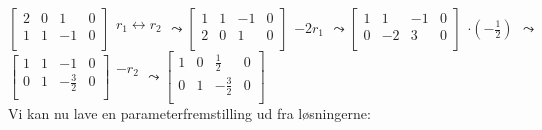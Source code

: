 \documentclass[a4paper,12pt]{article}
\begin{document}
$
\left[\begin{array}{ccc|c}
    2 & 0 & 1 & 0 \\
    1 & 1 & -1 & 0\\
\end{array}\right]
\begin{array}{ccc}
    r_1 \leftrightarrow r_2\\
\end{array}
\leadsto
\left[\begin{array}{ccc|c}
    1 & 1 & -1 & 0\\
    2 & 0 & 1 & 0 \\
\end{array}\right]
\begin{array}{ccc}
    \\
    -2r_1\\
\end{array}
\leadsto
\left[\begin{array}{ccc|c}
    1 & 1 & -1 & 0\\
    0 & -2 & 3 & 0 \\
\end{array}\right]
\begin{array}{ccc}
    \\
    \cdot (-\frac{1}{2})\\
\end{array}
\leadsto
$\\
$
\left[\begin{array}{ccc|c}
    1 & 1 & -1 & 0\\
    0 & 1 & -\frac{3}{2} & 0 \\
\end{array}\right]
\begin{array}{ccc}
    -r_2\\
    \\
\end{array}
\leadsto
\left[\begin{array}{ccc|c}
    1 & 0 & \frac{1}{2} & 0\\
    0 & 1 & -\frac{3}{2} & 0 \\
\end{array}\right]
\begin{array}{ccc}
    \\
    \\
\end{array}
$\\

Vi kan nu lave en parameterfremstilling ud fra løsningerne:\\
\end{document}
